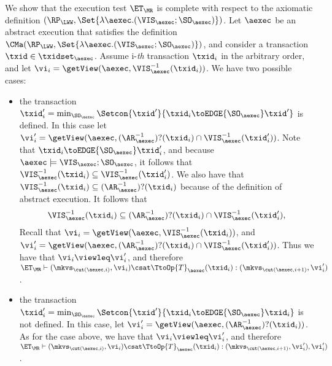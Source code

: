 We show that the execution test $\ET_{\MR}$ is complete 
with respect to the axiomatic definition $(\RP_{\LWW}, \Set{\lambda \aexec.(\VIS_{\aexec};\SO_{\aexec})})$. 
Let $\aexec$ be an abstract execution that satisfies the definition
$\CMa(\RP_{\LWW}, \Set{\lambda \aexec.(\VIS_{\aexec};\SO_{\aexec})})$, 
and consider a transaction $\txid \in \txidset_{\aexec}$. 
Assume i-\emph{th} transaction \( \txid_i \) in the arbitrary order,
and let $\vi_i = \getView(\aexec, \VIS^{-1}_{\aexec}(\txid_{i}))$.
We have two possible cases: 
\begin{itemize}
    \item the transaction $\txid'_{i} = \min_{\SO_{\aexec}}\Setcon{\txid' }{ \txid_{i} \toEDGE{\SO_{\aexec}} \txid'}$ is 
defined. In this case let $\vi'_{i} =\getView(\aexec, (\AR^{-1}_{\aexec})?(\txid_{i}) \cap \VIS^{-1}_{\aexec}(\txid'_{i}))$. 
Note that $\txid_{i} \toEDGE{\SO_{\aexec}} \txid'_{i}$, and because $\aexec \models \VIS_{\aexec} ; \SO_{\aexec}$, 
it follows that $\VIS^{-1}_{\aexec}(\txid_{i}) \subseteq \VIS^{-1}_{\aexec}(\txid'_{i})$. 
We also have that $\VIS^{-1}_{\aexec}(\txid_{i}) \subseteq (\AR^{-1}_{\aexec})?(\txid_{i})$ because of 
the definition of abstract execution. It follows that 
\[
\VIS^{-1}_{\aexec}(\txid_{i}) \subseteq (\AR^{-1}_{\aexec})?(\txid_{i}) \cap \VIS^{-1}_{\aexec}(\txid'_{i}),
\]
Recall that  $\vi_i = \getView(\aexec, \VIS^{-1}_{\aexec}(\txid_{i}))$, 
and $\vi'_{i} =\getView(\aexec, (\AR^{-1}_{\aexec})?(\txid_{i}) \cap \VIS^{-1}_{\aexec}(\txid'_{i}))$. 
Thus we have that $\vi_i \viewleq \vi'_{i}$, and therefore $\ET_{\MR} \vdash (\mkvs_{\cut(\aexec, i)}, \vi_i) 
\csat \TtoOp{T}_{\aexec}(\txid_{i}) : (\mkvs_{\cut(\aexec, i+1)},\vi'_{i})$. 
\item the transaction $\txid'_{i} = \min_{\SO_{\aexec}}\Setcon{\txid' }{ \txid_{i} \toEDGE{\SO_{\aexec}} \txid_{i}}$ 
is not defined. In this case, let $\vi'_{i} = \getView(\aexec, (\AR^{-1}_{\aexec})?(\txid_{i}))$. 
As for the case above, we have that $\vi_i \viewleq \vi'_{i}$, and therefore 
$\ET_{\MR} \vdash (\mkvs_{\cut(\aexec, i)}, \vi_i) \csat \TtoOp{T}_{\aexec}(\txid_{i}) : (\mkvs_{\cut(\aexec, i+1)},\vi'_{i}),\vi'_{i})$. 
\end{itemize}
